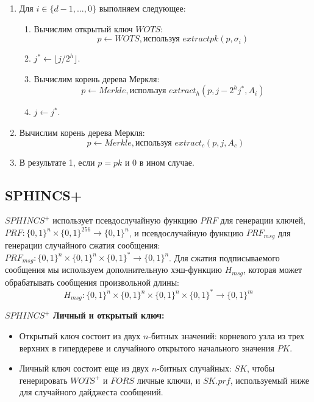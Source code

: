 \documentclass[a4paper, 14pt]{extarticle}
\begin{document}
\begin{itemize}
\begin{enumerate}
        \item Для $i \in \{d - 1, ..., 0\}$ выполняем следующее:

        \begin{enumerate}
            \item Вычислим открытый ключ $WOTS$:
            \[p \leftarrow WOTS, \text{используя } extractpk(p, \sigma_{i})\]
            \item $j^{*} \leftarrow \lfloor j/2^{h} \rfloor$.
            \item Вычислим корень дерева Меркля:
            \[p \leftarrow Merkle, \text{используя } extract_{h}(p, j - 2^{h}j^{*}, A_{i})\]
            \item $j \leftarrow j^{*}$.
        \end{enumerate}

        \item Вычислим корень дерева Меркля:
        \[p \leftarrow Merkle, \text{используя } extract_{c}(p, j, A_{c})\]

        \item В результате 1, если $p = pk$ и 0 в ином случае.
    \end{enumerate}
\end{itemize}

\subsection{SPHINCS+}
$SPHINCS^{+}$ использует псевдослучайную функцию $PRF$ для генерации ключей, $PRF : \{0, 1\}^{n} \times \{0, 1\}^{256} \rightarrow \{0, 1\}^{n}$, и псевдослучайную функцию $PRF_{msg}$ для генерации случайного сжатия сообщения: $PRF_{msg} : \{0, 1\}^{n} \times \{0, 1\}^{n} \times \{0, 1\}^{*} \rightarrow \{0, 1\}^{n}$. Для сжатия подписываемого сообщения мы используем дополнительную хэш-функцию $H_{msg}$, которая может обрабатывать сообщения произвольной длины:
\[H_{msg} : \{0, 1\}^{n} \times \{0, 1\}^{n} \times \{0, 1\}^{n} \times \{0, 1\}^{*} \rightarrow \{0, 1\}^{m}\]

\textbf{$SPHINCS^{+}$ Личный и открытый ключ:}

\begin{itemize}
    \item Открытый ключ состоит из двух $n$-битных значений: корневого узла из трех верхних в гипердереве и случайного открытого начального значения $PK$.
    \item Личный ключ состоит еще из двух $n$-битных случайных: $SK$, чтобы генерировать $WOTS^{+}$ и $FORS$ личные ключи, и $SK.prf$, используемый ниже для случайного дайджеста сообщений.
\end{itemize}
\end{document}
